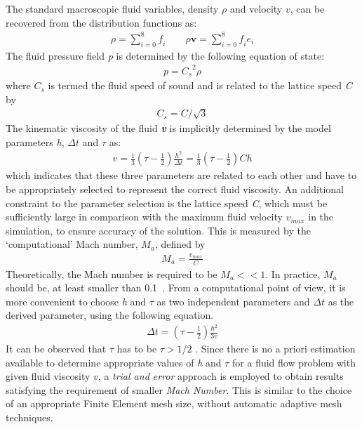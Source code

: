 The standard macroscopic fluid variables, density $\rho$ and velocity $\mathbf{\mathit{ v}}$, can be recovered from the distribution functions as:
\begin{eqnarray}
\rho = \sum\limits_{\mathit{i}=0}^{8}{\mathit{f_i}} \qquad \rho \mathbf{v} = \sum\limits_{\mathit{i}=0}^{8}{\mathit{f_i}}\mathbf{\mathit{e_i}}
\end{eqnarray}
The fluid pressure field \textit{p} is determined by the following equation of state:
\begin{eqnarray}
\mathit{p}=\mathit{C_s}^{2} \rho
\end{eqnarray}
where $\mathit{C_s}$ is termed the fluid speed of sound and is related to the lattice speed \textit{C} by
\begin{eqnarray}
\mathit{C_s}=\mathit{C}/\sqrt{3}
\end{eqnarray}
The kinematic viscosity of the fluid \textbf{\textit{v}} is implicitly determined by the model parameters \textit{h}, $\Delta \mathit{t}$ and $\tau$ as:
\begin{eqnarray}
\mathit{v}=\frac{1}{3}(\tau - \frac{1}{2})\frac{\mathit{h}^{2}}{\Delta \mathit{t}} = \frac{1}{3}(\tau - \frac{1}{2})\mathit{Ch}
\end{eqnarray}
which indicates that these three parameters are related to each other and have to be appropriately selected to represent the correct fluid viscosity. An additional constraint to the parameter selection is the lattice speed \textit{C}, which must be sufficiently large in comparison with the maximum fluid velocity $\mathit{v}_{\mathit{max}}$ in the simulation, to ensure accuracy of the solution. This is measured by the `computational' Mach number, $\mathit{M}_{\mathit{a}}$, defined by
\begin{eqnarray}
\mathit{M}_{\mathit{a}}=\frac{\mathit{v}_{\mathit{max}}}{\mathit{C}}
\end{eqnarray}
Theoretically, the Mach number is required to be $\mathit{M}_{\mathit{a}}<< 1$. In practice, $\mathit{M}_{\mathit{a}}$ should be, at least smaller than 0.1~\citep{He1997}. From a computational point of view, it is more convenient to choose \textit{h} and $\tau$ as two independent parameters and $\Delta \mathit{t}$ as the derived parameter, using the following equation.
\begin{eqnarray}
\Delta \mathit{t} = (\tau - \frac{1}{2}) \frac{h^{2}}{3\mathit{v}}
\end{eqnarray}
It can be observed that $\tau$ has to be $\tau > 1/2$ \citep{He1997}. Since there is no a priori estimation available to determine appropriate values of \textit{h} and $\tau$ for a fluid flow problem with given fluid viscosity $\mathit{v}$, a \textit{trial and error} approach is employed to obtain results satisfying the requirement of smaller \textit{Mach Number}. This is similar to the choice of an appropriate Finite Element mesh size, without automatic adaptive mesh techniques. 
